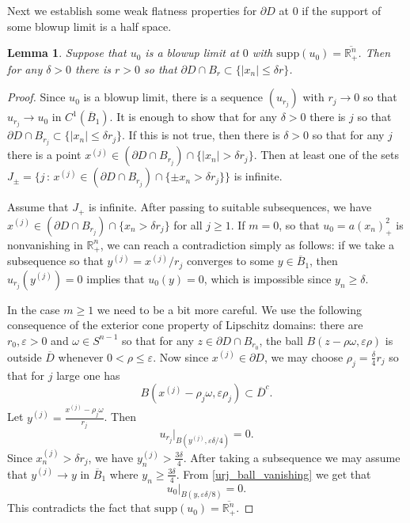 \documentclass[11pt,a4paper]{amsart}
\newtheorem{Lemma}[Theorem]{Lemma}
\theoremstyle{definition}
\numberwithin{equation}{section}
\newcommand{\mR}{\mathbb{R}}                    %
\newcommand{\abs}[1]{\lvert #1 \rvert}          %
\newcommand{\ol}[1]{\overline{#1}}
\newcommand{\supp}{\mathrm{supp}}
\newcommand{\eps}{\varepsilon}
\newcommand{\p}{\partial}
\begin{document}
Next we establish some weak flatness properties for $\p D$ at $0$ if the support of some blowup limit is a half space. 

\begin{Lemma} \label{lemma_weak_flatness}
Suppose that $u_0$ is a blowup limit at $0$ with $\supp(u_0) = \ol{\mR^n_+}$. Then for any $\delta > 0$ there is $r > 0$ so that $\p D \cap B_{r} \subset \{ \abs{x_n} \leq \delta r \}$.
\end{Lemma}
\begin{proof}
Since $u_0$ is a blowup limit, there is a sequence $(u_{r_j})$ with $r_j \to 0$ so that $u_{r_j} \to u_0$ in $C^1(\ol{B}_1)$. It is enough to show that for any $\delta > 0$ there is $j$ so that $\p D \cap B_{r_j} \subset \{ \abs{x_n} \leq \delta r_j \}$. If this is not true, then there is $\delta > 0$ so that for any $j$ there is a point $x^{(j)} \in (\p D \cap B_{r_j}) \cap \{ \abs{x_n} > \delta r_j \}$. Then at least one of the sets $J_{\pm} = \{ j \,:\, x^{(j)} \in (\p D \cap B_{r_j}) \cap \{  \pm x_n > \delta r_j \} \}$ is infinite.

Assume that $J_+$ is infinite. After passing to suitable subsequences, we have $x^{(j)} \in  (\p D \cap B_{r_j}) \cap \{  x_n > \delta r_j \}$ for all $j \geq 1$. If $m=0$, so that $u_0 = a (x_n)_+^2$ is nonvanishing in $\mR^n_+$, we can reach a contradiction simply as follows: if we take a subsequence so that $y^{(j)} = x^{(j)}/r_j$ converges to some $y \in \ol{B}_1$, then $u_{r_j}(y^{(j)}) = 0$ implies that $u_0(y) = 0$, which is impossible since $y_n \geq \delta$.

In the case $m \geq 1$ we need to be a bit more careful. We use the following consequence of the exterior cone property of Lipschitz domains: there are $r_0, \eps > 0$ and $\omega \in S^{n-1}$ so that for any $z \in \p D \cap B_{r_0}$, the ball $B(z - \rho \omega, \eps \rho)$ is outside $\ol{D}$ whenever $0 < \rho \leq \eps$. Now since $x^{(j)} \in \p D$, we may choose $\rho_j = \frac{\delta}{4} r_j$ so that for $j$ large one has 
\[
B(x^{(j)} - \rho_j \omega, \eps \rho_j) \subset \ol{D}^c.
\]
Let $y^{(j)} = \frac{x^{(j)} - \rho_j \omega}{r_j}$. Then 
\begin{equation} \label{urj_ball_vanishing}
u_{r_j}|_{B(y^{(j)}, \eps \delta/4)} = 0.
\end{equation}
Since $x^{(j)}_n > \delta r_j$, we have $y^{(j)}_n > \frac{3\delta}{4}$. After taking a subsequence we may assume that $y^{(j)} \to y$ in $\ol{B}_1$ where $y_n \geq \frac{3\delta}{4}$. From \eqref{urj_ball_vanishing} we get that 
\[
u_0|_{B(y, \eps \delta/8)} = 0.
\]
This contradicts the fact that $\supp(u_0) = \ol{\mR^n_+}$.


\end{proof}
\end{document}
